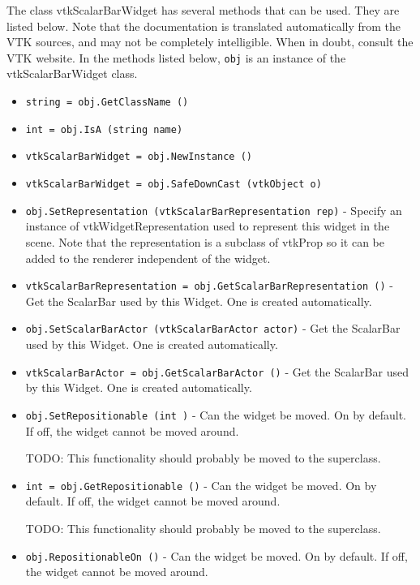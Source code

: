 The class vtkScalarBarWidget has several methods that can be used.
  They are listed below.
Note that the documentation is translated automatically from the VTK sources,
and may not be completely intelligible.  When in doubt, consult the VTK website.
In the methods listed below, \verb|obj| is an instance of the vtkScalarBarWidget class.
\begin{itemize}
\item  \verb|string = obj.GetClassName ()|

\item  \verb|int = obj.IsA (string name)|

\item  \verb|vtkScalarBarWidget = obj.NewInstance ()|

\item  \verb|vtkScalarBarWidget = obj.SafeDownCast (vtkObject o)|

\item  \verb|obj.SetRepresentation (vtkScalarBarRepresentation rep)| -  Specify an instance of vtkWidgetRepresentation used to represent this
 widget in the scene. Note that the representation is a subclass of vtkProp
 so it can be added to the renderer independent of the widget.

\item  \verb|vtkScalarBarRepresentation = obj.GetScalarBarRepresentation ()| -  Get the ScalarBar used by this Widget. One is created automatically.

\item  \verb|obj.SetScalarBarActor (vtkScalarBarActor actor)| -  Get the ScalarBar used by this Widget. One is created automatically.

\item  \verb|vtkScalarBarActor = obj.GetScalarBarActor ()| -  Get the ScalarBar used by this Widget. One is created automatically.

\item  \verb|obj.SetRepositionable (int )| -  Can the widget be moved. On by default. If off, the widget cannot be moved
 around.

 TODO: This functionality should probably be moved to the superclass.

\item  \verb|int = obj.GetRepositionable ()| -  Can the widget be moved. On by default. If off, the widget cannot be moved
 around.

 TODO: This functionality should probably be moved to the superclass.

\item  \verb|obj.RepositionableOn ()| -  Can the widget be moved. On by default. If off, the widget cannot be moved
 around.


\end{itemize}
